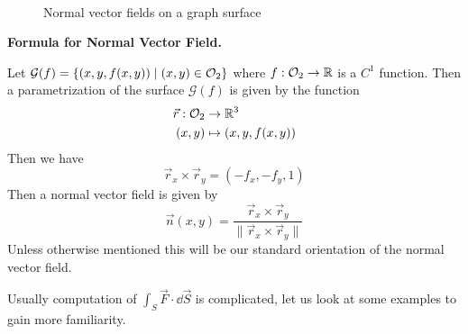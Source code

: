 \documentclass[../Analysis-3.tex]{subfiles}
\begin{document}
\

\begin{tcolorbox}

  \begin{figure}
    \centering
    \caption{Normal vector fields on a graph surface}
    \label{fig2:27}
  \end{figure}

  \textbf{Formula for Normal Vector Field.}

  Let $\mathcal{G}(f) = \qty{ (x,y,f(x,y)) \mid (x,y) \in \mathcal{O}_{2}}$ where $f: \mathcal{O}_{2} \to \mathbb{R}$ is a $C^1$ function. Then a parametrization of the surface $\mathcal{G}(f)$ is given by the function
  \begin{align*}
    \vec{r} : \mathcal{O}_{2} & \to \mathbb{R}^3             \\
    (x,y)            & \mapsto (x,y,f(x,y))
  \end{align*}
  Then we have
  \[
    \vec{r}_x \times \vec{r}_y = (-f_x, -f_y, 1)
  \]
  Then a normal vector field is given by
  \[
    \vec{n}(x,y) = \frac{\vec{r}_x \times \vec{r}_y}{\|\vec{r}_x \times \vec{r}_y \|}
  \]
  Unless otherwise mentioned this will be our standard orientation of the normal vector field.

\end{tcolorbox}

Usually computation of $\displaystyle\int_S \vec{F} \cdot \dd \vec{S}$ is complicated, let us look at some examples to gain more familiarity.
\end{document}
